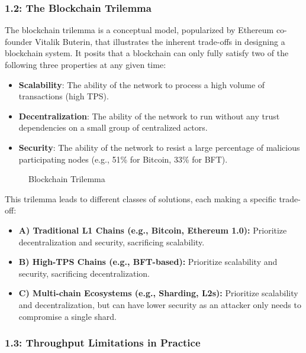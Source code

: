 \subsubsection{1.2: The Blockchain
Trilemma}\label{the-blockchain-trilemma}

The blockchain trilemma is a conceptual model, popularized by Ethereum
co-founder Vitalik Buterin, that illustrates the inherent trade-offs in
designing a blockchain system. It posits that a blockchain can only
fully satisfy two of the following three properties at any given time:

\begin{itemize}
\tightlist
\item
  \textbf{Scalability}: The ability of the network to process a high
  volume of transactions (high TPS).
\item
  \textbf{Decentralization}: The ability of the network to run without
  any trust dependencies on a small group of centralized actors.
\item
  \textbf{Security}: The ability of the network to resist a large
  percentage of malicious participating nodes (e.g., 51\% for Bitcoin,
  33\% for BFT).
\end{itemize}

\begin{figure}
\centering

\caption{Blockchain Trilemma}
\end{figure}

This trilemma leads to different classes of solutions, each making a
specific trade-off:

\begin{itemize}
\tightlist
\item
  \textbf{A) Traditional L1 Chains (e.g., Bitcoin, Ethereum 1.0):}
  Prioritize decentralization and security, sacrificing scalability.
\item
  \textbf{B) High-TPS Chains (e.g., BFT-based):} Prioritize scalability
  and security, sacrificing decentralization.
\item
  \textbf{C) Multi-chain Ecosystems (e.g., Sharding, L2s):} Prioritize
  scalability and decentralization, but can have lower security as an
  attacker only needs to compromise a single shard.
\end{itemize}

\subsubsection{1.3: Throughput Limitations in
Practice}\label{throughput-limitations-in-practice}


